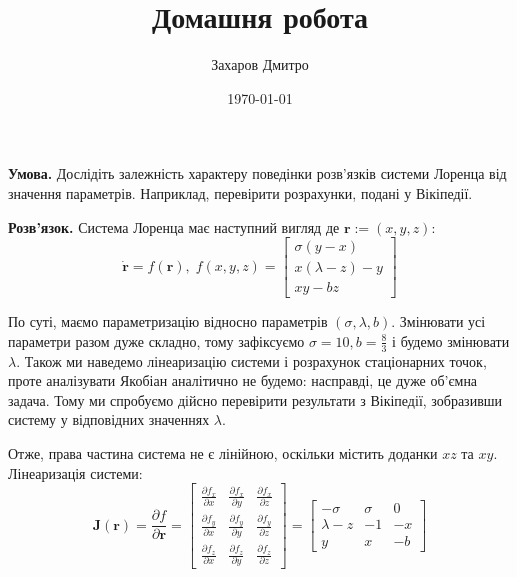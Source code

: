 \documentclass[oneside,solution]{tmpl}
\title{Домашня робота}
\author{Захаров Дмитро}
\date{\today}
\begin{document}
\maketitle



\hspace{20px}\textbf{Умова.} Дослідіть залежність характеру поведінки розв'язків системи Лоренца від значення параметрів. Наприклад, перевірити розрахунки, подані у Вікіпедії.

\textbf{Розв'язок.} Система Лоренца має наступний вигляд де $\boldsymbol{r} := (x,y,z)$:
\begin{equation}
    \dot{\boldsymbol{r}} = f(\boldsymbol{r}), \; 
    f(x,y,z) = 
    \begin{bmatrix}
        \sigma(y-x) \\
        x(\lambda - z) - y \\
        xy - bz
    \end{bmatrix}
\end{equation}

По суті, маємо параметризацію відносно параметрів $(\sigma,\lambda,b)$. Змінювати усі параметри разом дуже складно, тому зафіксуємо $\sigma=10,b=\frac{8}{3}$ і будемо змінювати $\lambda$. Також ми наведемо лінеаризацію системи і розрахунок стаціонарних точок, проте аналізувати Якобіан аналітично не будемо: насправді, це дуже об'ємна задача. Тому ми спробуємо дійсно перевірити результати з Вікіпедії, зобразивши систему у відповідних значеннях $\lambda$.

Отже, права частина система не є лінійною, оскільки містить доданки $xz$ та $xy$. Лінеаризація системи:
\begin{equation}
    \boldsymbol{J}(\boldsymbol{r})=\frac{\partial f}{\partial \boldsymbol{r}} = \begin{bmatrix}
        \frac{\partial f_x}{\partial x} & \frac{\partial f_x}{\partial y} & \frac{\partial f_x}{\partial z} \\
        \frac{\partial f_y}{\partial x} & \frac{\partial f_y}{\partial y} & \frac{\partial f_y}{\partial z} \\
        \frac{\partial f_z}{\partial x} & \frac{\partial f_z}{\partial y} & \frac{\partial f_z}{\partial z}
    \end{bmatrix} = \begin{bmatrix}
        -\sigma & \sigma & 0 \\
        \lambda - z & -1 & -x \\
        y & x & -b
    \end{bmatrix}
\end{equation}
\end{document}
